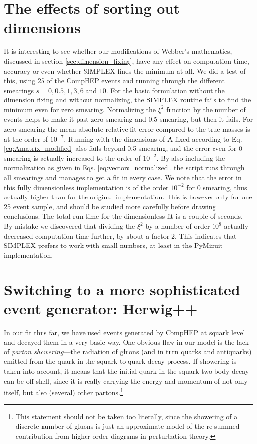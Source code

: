 \documentclass[twoside,english]{uiofysmaster}
\begin{document}
\section{The effects of sorting out dimensions}
It is interesting to see whether our modifications of Webber's mathematics, discussed in section \ref{sec:dimension_fixing}, have any effect on computation time, accuracy or even whether {\ttfamily SIMPLEX} finds the minimum at all. We did a test of this, using 25 of the {\ttfamily CompHEP} events and running through the different smearings $s= 0,0.5,1,3,6$ and $10$. For the basic formulation without the dimension fixing and without normalizing, the {\ttfamily SIMPLEX} routine fails to find the minimum even for zero smearing. Normalizing the $\xi^2$ function by the number of events helps to make it past zero smearing and 0.5 smearing, but then it fails. For zero smearing the mean absolute relative fit error compared to the true masses is at the order of $10^{-7}$. Running with the dimensions of $\mathbf{A}$ fixed according to Eq. \eqref{eq:Amatrix_modified} also fails beyond 0.5 smearing, and the error even for 0 smearing is actually increased to the order of $10^{-2}$. By also including the normalization as given in Eqs. \eqref{eq:vectors_normalized}, the script runs through all smearings and manages to get a fit in every case. We note that the error in this fully dimensionless implementation is of the order $10^{-2}$ for 0 smearing, thus actually higher than for the original implementation. This is however only for one 25 event sample, and should be studied more carefully before drawing conclusions. The total run time for the dimensionless fit is a couple of seconds. By mistake we discovered that dividing the $\xi^2$ by a number of order $10^8$ actually decreased computation time further, by about a factor 2. This indicates that {\ttfamily SIMPLEX} prefers to work with small numbers, at least in the {\ttfamily PyMinuit} implementation.



\section{Switching to a more sophisticated event generator: {\ttfamily Herwig++}}
In our fit thus far, we have used events generated by {\ttfamily CompHEP} at squark level and decayed them in a very basic way. One obvious flaw in our model is the lack of {\it parton showering}---the radiation of gluons (and in turn quarks and antiquarks) emitted from the quark in the squark to quark decay process. If showering is taken into account, it means that the initial quark in the squark two-body decay can be off-shell, since it is really carrying the energy and momentum of not only itself, but also (several) other partons.\footnote{This statement should not be taken too literally, since the showering of a discrete number of gluons is just an approximate model of the re-summed contribution from higher-order diagrams in perturbation theory.}
\end{document}
